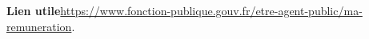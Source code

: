 \textbf{Lien utile\hspace{.5em}}\url{https://www.fonction-publique.gouv.fr/etre-agent-public/ma-remuneration}.



%
%
%
%
%
%
